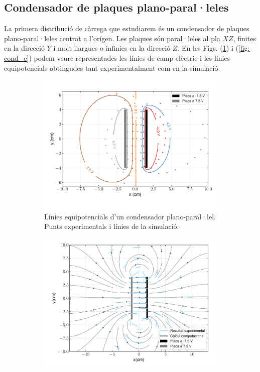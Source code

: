\documentclass[11pt]{article}
\begin{document}
\subsection{Condensador de plaques plano-paral·leles}\label{sec: cond}
La primera distribució de càrrega que estudiarem és un condensador de plaques plano-paral·leles centrat a l'orígen. Les plaques són paral·leles al pla $XZ$, finites en la direcció $Y$ i molt llargues o infinies en la direcció $Z$.
En les Figs. (\ref{fig: cond_pot}) i (\ref{fig: cond_e}) podem veure representades les línies de camp elèctric i les línies equipotencials obtingudes tant experimentalment com en la simulació.   
\begin{figure}[h]
    \centering
    \begin{subfigure}{0.495\textwidth}
        \centering
        \includegraphics[width=\textwidth]{cond_combi_def.pdf}
        \caption{Línies equipotencials d'un condensador plano-paral·lel. Punts experimentals i línies de la simulació.}
        \label{fig: cond_pot}
    \end{subfigure}
    \begin{subfigure}{0.495\textwidth} 
        \centering
        \includegraphics[width=\textwidth]{cond_camp.pdf}

\end{subfigure}
\end{figure}
\end{document}
